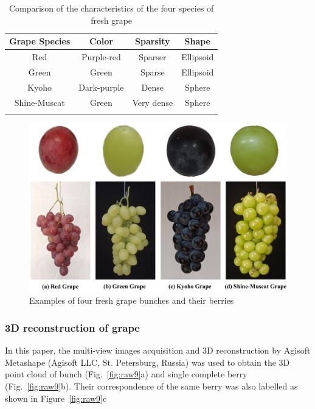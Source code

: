 \documentclass[12pt]{article}
\begin{document}
\begin{table}[h]
    \centering
    \caption{Comparison of the characteristics of the four species of fresh grape}
    \begin{tabular}{cccc}
        \hline
        \textbf{Grape Species} & \textbf{Color} & \textbf{Sparsity} & \textbf{Shape} \\
        \hline
        Red & Purple-red & Sparser & Ellipsoid \\
        Green & Green & Sparse & Ellipsoid \\
        Kyoho & Dark-purple & Dense & Sphere \\
        Shine-Muscat & Green & Very dense & Sphere \\
        \hline
    \label{tbl:1}
    \end{tabular}
\end{table}

\begin{figure}[hbt!]
    \centering
    \includegraphics[width=1\textwidth]{figures/Figure2.pdf}
    \caption{Examples of four fresh grape bunches and their berries}
    \label{fig:raw86}
\end{figure}

\subsubsection{3D reconstruction of grape}
\label{sec:212}

In this paper, the multi-view images acquisition and 3D reconstruction by Agisoft Metashape (Agisoft LLC, St. Petersburg, Russia) was used to obtain the 3D point cloud of bunch (Fig.~\ref{fig:raw9}a) and single complete berry (Fig.~\ref{fig:raw9}b). 
Their correspondence of the same berry was also labelled as shown in Figure~\ref{fig:raw9}c
\end{document}
